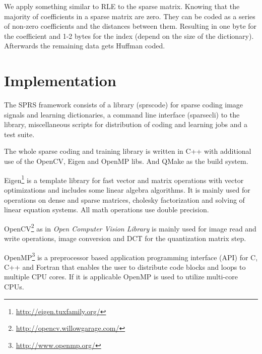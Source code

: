 We apply something similar to RLE to the sparse matrix. Knowing that the
majority of coefficients in a sparse matrix are zero. They can be coded
as a series of non-zero coefficients and the distances between them.
Resulting in one byte for the coefficient and 1-2 bytes for the index
(depend on the size of the dictionary).
Afterwards the remaining data gets Huffman coded.





\section{Implementation}
The SPRS framework consists of a library (sprscode) for sparse coding image
signals and learning dictionaries, a command line interface (sparsecli) to the
library, miscellaneous scripts for distribution of coding and learning jobs
and a test suite.

The whole sparse coding and training library is written in C++ with
additional use of the OpenCV, Eigen and OpenMP libs. And QMake as the build
system. 

Eigen\footnote{\url{http://eigen.tuxfamily.org/}}
is a template library for fast vector and matrix operations with vector
optimizations and includes some linear algebra algorithms. It is mainly used for
operations on dense and sparse matrices, cholesky factorization and solving of
linear equation systems. All math operations use double precision. 

OpenCV\footnote{\url{http://opencv.willowgarage.com/}} as
in \emph{Open Computer Vision Library} is mainly used for
image read and write operations, image conversion and DCT for the
quantization matrix step. 

OpenMP\footnote{\url{http://www.openmp.org/}} is a preprocessor
based application programming interface (API) for C, C++ and Fortran that
enables the user to distribute code blocks and loops to multiple CPU cores. If
it is applicable OpenMP is used to utilize multi-core CPUs. 


